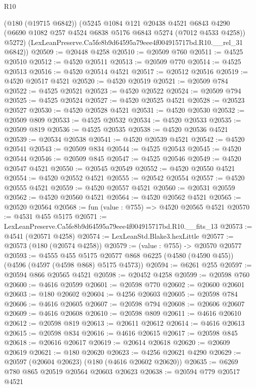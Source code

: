 \begin{lexlean}{R10}
\begin{coremodule}
      (@180 (@19715 @6842))
      (@5245
        @1084
        @121
        @20438
        @4521
        @6843
        @4290
        (@6690 @1082 @257 @4524 @6838 @5176 @6843 @5274 (@7012 @4533 @4258))
        @5272)
      (LexLeanPreserve.Ca5fe8b9d64595a79eee4f004915717bd.R10.__rel_31 @6842))
@20509 := @20448 @4258
@20510 := @20509 @760
@20511 := @4525 @20510
@20512 := @4520 @20511
@20513 := @20509 @770
@20514 := @4525 @20513
@20516 := @4520 @20514 @4521
@20517 := @20512 @20516
@20519 := @4520 @20517 @4521
@20520 := @4520 @20519
@20521 := @20509 @784
@20522 := @4525 @20521
@20523 := @4520 @20522
@20524 := @20509 @794
@20525 := @4525 @20524
@20527 := @4520 @20525 @4521
@20528 := @20523 @20527
@20530 := @4520 @20528 @4521
@20531 := @4520 @20530
@20532 := @20509 @809
@20533 := @4525 @20532
@20534 := @4520 @20533
@20535 := @20509 @819
@20536 := @4525 @20535
@20538 := @4520 @20536 @4521
@20539 := @20534 @20538
@20541 := @4520 @20539 @4521
@20542 := @4520 @20541
@20543 := @20509 @834
@20544 := @4525 @20543
@20545 := @4520 @20544
@20546 := @20509 @845
@20547 := @4525 @20546
@20549 := @4520 @20547 @4521
@20550 := @20545 @20549
@20552 := @4520 @20550 @4521
@20554 := @4520 @20552 @4521
@20555 := @20542 @20554
@20557 := @4520 @20555 @4521
@20559 := @4520 @20557 @4521
@20560 := @20531 @20559
@20562 := @4520 @20560 @4521
@20564 := @4520 @20562 @4521
@20565 := @20520 @20564
@20568 := fun (value : @755) => @4520 @20565 @4521
@20570 := @4531 @455 @5175
@20571 := LexLeanPreserve.Ca5fe8b9d64595a79eee4f004915717bd.R10.__fits_13
@20573 := @4541 (@20571 @4258)
@20574 := LexLeanStd.Blake3.hexLittle
@20577 := @20573 (@180 (@20574 @4258))
@20579 := (value : @755) -> @20570 @20577
@20593 := @4555
    @455
    @5175
    @20577
    @868
    @6225
    (@4580 (@4590 @455))
    (@4596 (@4597 (@4598 @868) @5175 @4573))
@20594 := @6261 @255
@20597 := @20594 @866 @20565 @4521
@20598 := @20452 @4258
@20599 := @20598 @760
@20600 := @4616 @20599
@20601 := @20598 @770
@20602 := @20600 @20601
@20603 := @180 @20602
@20604 := @4256 @20603
@20605 := @20598 @784
@20606 := @4616 @20605
@20607 := @20598 @794
@20608 := @20606 @20607
@20609 := @4616 @20608
@20610 := @20598 @809
@20611 := @4616 @20610
@20612 := @20598 @819
@20613 := @20611 @20612
@20614 := @4616 @20613
@20615 := @20598 @834
@20616 := @4616 @20615
@20617 := @20598 @845
@20618 := @20616 @20617
@20619 := @20614 @20618
@20620 := @20609 @20619
@20621 := @180 @20620
@20623 := @4256 @20621 @4290
@20629 := @20597 (@20604 @20623) (@180 (@4616 @20602 @20620))
@20635 := @6269 @780 @865 @20519 @20564 @20603 @20623
@20638 := @20594 @779 @20517 @4521

\end{coremodule}
\end{lexlean}

